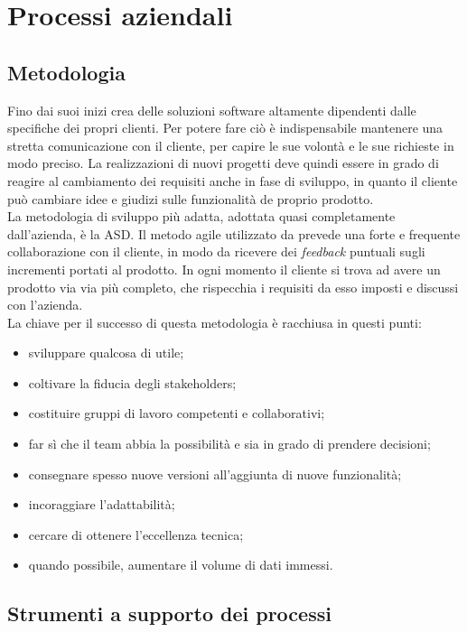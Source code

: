 \section{Processi aziendali}
\subsection{Metodologia}
Fino dai suoi inizi \azienda{} crea delle soluzioni software altamente dipendenti dalle specifiche dei propri clienti. Per potere fare ciò è indispensabile mantenere una stretta comunicazione con il cliente, per capire le sue volontà e le sue richieste in modo preciso. La realizzazioni di nuovi progetti deve quindi essere in grado di reagire al cambiamento dei requisiti anche in fase di sviluppo, in quanto il cliente può cambiare idee e giudizi sulle funzionalità de proprio prodotto.\\
La metodologia di sviluppo più adatta, adottata quasi completamente dall'azienda, è la \gls{ASD}.
Il metodo agile utilizzato da \azienda{} prevede una forte e frequente collaborazione con il cliente, in modo da ricevere dei \emph{feedback} puntuali sugli incrementi portati al prodotto. In ogni momento il cliente si trova ad avere un prodotto via via più completo, che rispecchia i requisiti da esso imposti e discussi con l'azienda.\\
La chiave per il successo di questa metodologia è racchiusa in questi punti:
\begin{itemize}
	\item sviluppare qualcosa di utile;
	\item coltivare la fiducia degli \glspl{stakeholder};
	\item costituire gruppi di lavoro competenti e collaborativi;
	\item far sì che il team abbia la possibilità e sia in grado di prendere decisioni;
	\item consegnare spesso nuove versioni all'aggiunta di nuove funzionalità;
	\item incoraggiare l'adattabilità;
	\item cercare di ottenere l'eccellenza tecnica;
	\item quando possibile, aumentare il volume di dati immessi.
\end{itemize}

\subsection{Strumenti a supporto dei processi}
\label{Teconologie}

